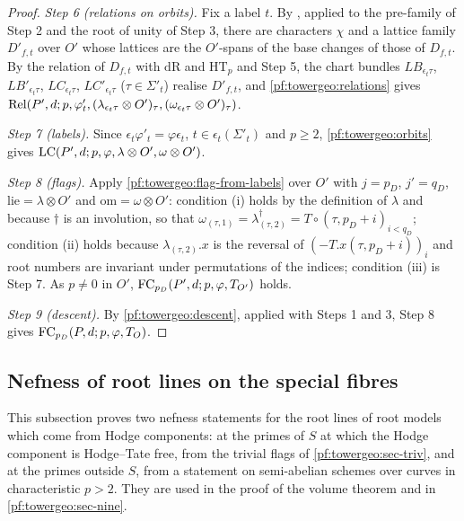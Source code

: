 \begin{proof}
\emph{Step 6 (relations on orbits).} Fix a label $t$. By
, applied to the pre-family of Step 2 and the root of
unity of Step 3, there are characters $\chi$ and a lattice family $D'_{f,t}$ over $O'$ whose lattices are the
$O'$-spans of the base changes of those of $D_{f,t}$. By the relation of $D_{f,t}$ with $\mathrm{dR}$ and
$\mathrm{HT}_p$ and Step 5, the chart bundles $LB_{\epsilon_t\tau}$, $LB'_{\epsilon_t\tau}$,
$LC_{\epsilon_t\tau}$, $LC'_{\epsilon_t\tau}$ ($\tau\in\Sigma'_t$) realise $D'_{f,t}$, and
\cref{pf:towergeo:relations} gives
$\mathrm{Rel}(P',d;p,\varphi'_t,(\lambda_{\epsilon_t\tau}\otimes O')_\tau,(\omega_{\epsilon_t\tau}\otimes O')_\tau)$.

\emph{Step 7 (labels).} Since $\epsilon_t\varphi'_t=\varphi\epsilon_t$, $t\in\epsilon_t(\Sigma'_t)$ and
$p\ge2$, \cref{pf:towergeo:orbits} gives $\mathrm{LC}(P',d;p,\varphi,\lambda\otimes O',\omega\otimes O')$.

\emph{Step 8 (flags).} Apply \cref{pf:towergeo:flag-from-labels} over $O'$ with $j=p_D$, $j'=q_D$,
$\mathrm{lie}=\lambda\otimes O'$ and $\mathrm{om}=\omega\otimes O'$: condition (i) holds by the definition
of $\lambda$ and because $\dagger$ is an involution, so that
$\omega_{(\tau,1)}=\lambda_{(\tau,2)}^\dagger=T\circ(\tau,p_D+i)_{i<q_D}$; condition (ii) holds because
$\lambda_{(\tau,2)}.x$ is the reversal of $(-T.x(\tau,p_D+i))_i$ and root numbers are invariant under
permutations of the indices; condition (iii) is Step 7. As $p\ne0$ in $O'$,
$\mathrm{FC}_{p_D}(P',d;p,\varphi,T_{O'})$ holds.

\emph{Step 9 (descent).} By \cref{pf:towergeo:descent}, applied with Steps 1 and 3, Step 8 gives
$\mathrm{FC}_{p_D}(P,d;p,\varphi,T_O)$.
\end{proof}

\subsection{Nefness of root lines on the special fibres}\label{pf:towergeo:sec-nef}

This subsection proves two nefness statements for the root lines of root models which come from Hodge
components: at the primes of $S$ at which the Hodge component is Hodge--Tate free, from the trivial flags of
\cref{pf:towergeo:sec-triv}, and at the primes outside $S$, from a statement on semi-abelian schemes over curves
in characteristic $p>2$. They are used in the proof of the volume theorem and in \cref{pf:towergeo:sec-nine}.

